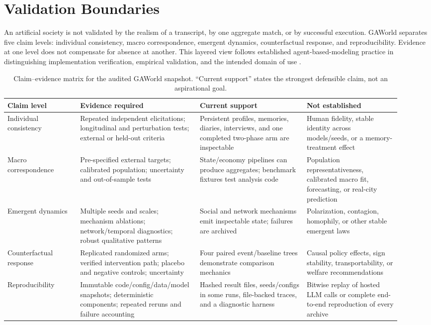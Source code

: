 \section{Validation Boundaries}
\label{sec:validation-boundaries}

An artificial society is not validated by the realism of a transcript, by one
aggregate match, or by successful execution.  GAWorld separates five claim
levels: individual consistency, macro correspondence, emergent dynamics,
counterfactual response, and reproducibility.  Evidence at one level does not
compensate for absence at another.  This layered view follows established
agent-based-modeling practice in distinguishing implementation verification,
empirical validation, and the intended domain of use
\citep{grimm2006odd,windrum2007empirical,fagiolo2007critical}.

\begin{table}[t]
\centering
\small
\caption{Claim--evidence matrix for the audited GAWorld snapshot.  ``Current
support'' states the strongest defensible claim, not an aspirational goal.}
\label{tab:claim-evidence}
\begin{tabular}{@{}p{0.17\linewidth}p{0.28\linewidth}p{0.25\linewidth}p{0.22\linewidth}@{}}
\toprule
Claim level & Evidence required & Current support & Not established \\
\midrule
Individual consistency & Repeated independent elicitations; longitudinal and perturbation tests; external or held-out criteria & Persistent profiles, memories, diaries, interviews, and one completed two-phase arm are inspectable & Human fidelity, stable identity across models/seeds, or a memory-treatment effect \\
Macro correspondence & Pre-specified external targets; calibrated population; uncertainty and out-of-sample tests & State/economy pipelines can produce aggregates; benchmark fixtures test analysis code & Population representativeness, calibrated macro fit, forecasting, or real-city prediction \\
Emergent dynamics & Multiple seeds and scales; mechanism ablations; network/temporal diagnostics; robust qualitative patterns & Social and network mechanisms emit inspectable state; failures are archived & Polarization, contagion, homophily, or other stable emergent laws \\
Counterfactual response & Replicated randomized arms; verified intervention path; placebo and negative controls; uncertainty & Four paired event/baseline trees demonstrate comparison mechanics & Causal policy effects, sign stability, transportability, or welfare recommendations \\
Reproducibility & Immutable code/config/data/model snapshots; deterministic components; repeated reruns and failure accounting & Hashed result files, seeds/configs in some runs, file-backed traces, and a diagnostic harness & Bitwise replay of hosted LLM calls or complete end-to-end reproduction of every archive \\
\bottomrule
\end{tabular}
\end{table}

